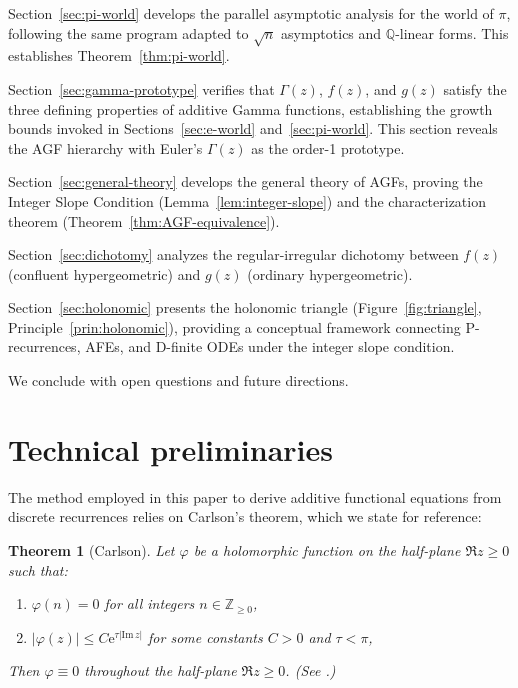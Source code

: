 \documentclass[11pt,reqno]{amsart}
\newtheorem{theorem}{Theorem}[section]
\theoremstyle{definition}
\newcommand{\N}{\mathbb{Z}_{\ge 0}}
\newcommand{\Q}{\mathbb{Q}}
\newcommand{\ee}{\mathrm{e}}
\numberwithin{equation}{section}
\begin{document}
Section~\ref{sec:pi-world} develops the parallel asymptotic analysis for the world of $\pi$, following the same program adapted to $\sqrt{n}$ asymptotics and $\Q$-linear forms. This establishes Theorem~\ref{thm:pi-world}.

Section~\ref{sec:gamma-prototype} verifies that $\Gamma(z)$, $f(z)$, and $g(z)$ satisfy the three defining properties of additive Gamma functions, establishing the growth bounds invoked in Sections~\ref{sec:e-world} and~\ref{sec:pi-world}. This section reveals the AGF hierarchy with Euler's $\Gamma(z)$ as the order-1 prototype.

Section~\ref{sec:general-theory} develops the general theory of AGFs, proving the Integer Slope Condition (Lemma~\ref{lem:integer-slope}) and the characterization theorem (Theorem~\ref{thm:AGF-equivalence}).

Section~\ref{sec:dichotomy} analyzes the regular-irregular dichotomy between $f(z)$ (confluent hypergeometric) and $g(z)$ (ordinary hypergeometric).

Section~\ref{sec:holonomic} presents the holonomic triangle (Figure~\ref{fig:triangle}, Principle~\ref{prin:holonomic}), providing a conceptual framework connecting P-recurrences, AFEs, and D-finite ODEs under the integer slope condition.

We conclude with open questions and future directions.

\section{Technical preliminaries}\label{sec:mirror}

The method employed in this paper to derive additive functional equations from discrete recurrences relies on Carlson's theorem, which we state for reference:

\begin{theorem}[Carlson]\label{thm:carlson}
Let $\varphi$ be a holomorphic function on the half-plane $\Re z \geq 0$ such that:
\begin{enumerate}[label=(\roman*)]
\item $\varphi(n) = 0$ for all integers $n \in \N$,
\item $|\varphi(z)| \leq C \ee^{\tau |\mathrm{Im}\, z|}$ for some constants $C > 0$ and $\tau < \pi$,
\end{enumerate}
Then $\varphi \equiv 0$ throughout the half-plane $\Re z \geq 0$. \textup{(See \cite[Theorem 6.20]{Titchmarsh1939}.)}
\end{theorem}
\end{document}
